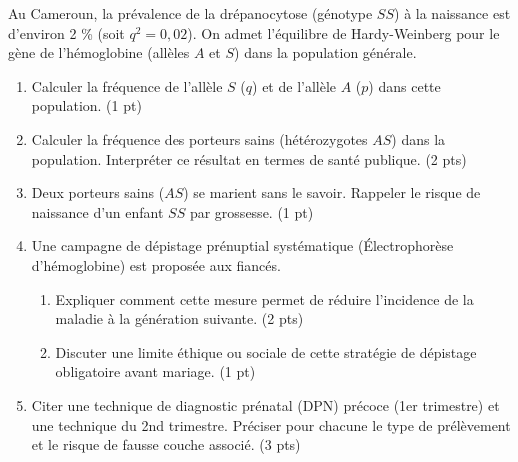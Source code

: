 \documentclass[11pt]{article}
\begin{document}
\begin{exercice}
Au Cameroun, la prévalence de la drépanocytose (génotype $SS$) à la naissance est d'environ 2 \% (soit $q^2 = 0,02$). On admet l'équilibre de Hardy-Weinberg pour le gène de l'hémoglobine (allèles $A$ et $S$) dans la population générale.
\begin{enumerate}
    \item Calculer la fréquence de l'allèle $S$ ($q$) et de l'allèle $A$ ($p$) dans cette population. (1 pt)
    \item Calculer la fréquence des porteurs sains (hétérozygotes $AS$) dans la population. Interpréter ce résultat en termes de santé publique. (2 pts)
    \item Deux porteurs sains ($AS$) se marient sans le savoir. Rappeler le risque de naissance d'un enfant $SS$ par grossesse. (1 pt)
    \item Une campagne de dépistage prénuptial systématique (Électrophorèse d'hémoglobine) est proposée aux fiancés.
    \begin{enumerate}
        \item Expliquer comment cette mesure permet de réduire l'incidence de la maladie à la génération suivante. (2 pts)
        \item Discuter une limite éthique ou sociale de cette stratégie de dépistage obligatoire avant mariage. (1 pt)
    \end{enumerate}
    \item Citer une technique de diagnostic prénatal (DPN) précoce (1er trimestre) et une technique du 2nd trimestre. Préciser pour chacune le type de prélèvement et le risque de fausse couche associé. (3 pts)
\end{enumerate}
\end{exercice}
\end{document}
